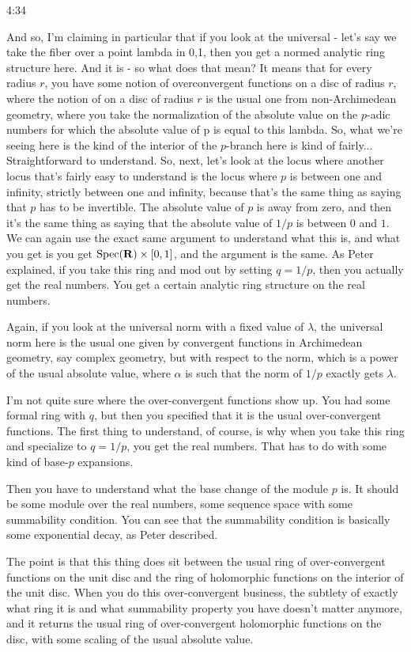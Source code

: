 \begin{unfinished}{4:34}
\begin{example}
And so, I'm claiming in particular that if you look at the universal - let's say we take the fiber over a point lambda in 0,1, then you get a normed analytic ring structure here. And it is - so what does that mean? It means that for every radius $r$, you have some notion of overconvergent functions on a disc of radius $r$, where the notion of on a disc of radius $r$ is the usual one from non-Archimedean geometry, where you take the normalization of the absolute value on the $p$-adic numbers for which the absolute value of p is equal to this lambda. So, what we're seeing here is the kind of the interior of the $p$-branch here is kind of fairly...
Straightforward to understand. So, next, let's look at the locus where another locus that's fairly easy to understand is the locus where $p$ is between one and infinity, strictly between one and infinity, because that's the same thing as saying that $p$ has to be invertible. The absolute value of $p$ is away from zero, and then it's the same thing as saying that the absolute value of $1/p$ is between $0$ and $1$. We can again use the exact same argument to understand what this is, and what you get is you get $\text{Spec}(\mathbf R) \times [0,1]$, and the argument is the same. As Peter explained, if you take this ring and mod out by setting $q = 1/p$, then you actually get the real numbers. You get a certain analytic ring structure on the real numbers.

Again, if you look at the universal norm with a fixed value of $\lambda$, the universal norm here is the usual one given by convergent functions in Archimedean geometry, say complex geometry, but with respect to the norm, which is a power of the usual absolute value, where $\alpha$ is such that the norm of $1/p$ exactly gets $\lambda$.

I'm not quite sure where the over-convergent functions show up. You had some formal ring with $q$, but then you specified that it is the usual over-convergent functions. The first thing to understand, of course, is why when you take this ring and specialize to $q = 1/p$, you get the real numbers. That has to do with some kind of base-$p$ expansions.

Then you have to understand what the base change of the module $p$ is. It should be some module over the real numbers, some sequence space with some summability condition. You can see that the summability condition is basically some exponential decay, as Peter described.

The point is that this thing does sit between the usual ring of over-convergent functions on the unit disc and the ring of holomorphic functions on the interior of the unit disc. When you do this over-convergent business, the subtlety of exactly what ring it is and what summability property you have doesn't matter anymore, and it returns the usual ring of over-convergent holomorphic functions on the disc, with some scaling of the usual absolute value.


\end{example}
\end{unfinished}
